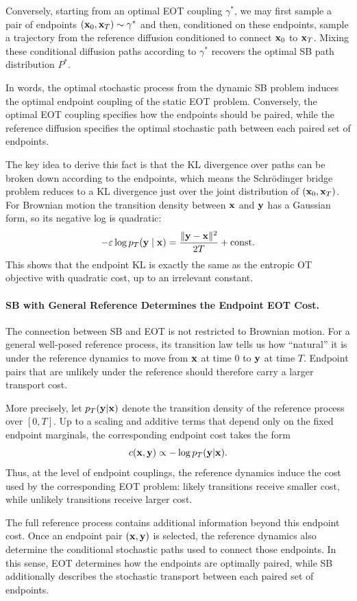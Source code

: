 Conversely, starting from an optimal EOT coupling $\gamma^*$, we may first
sample a pair of endpoints
$({\mathbf{x}}_0,{\mathbf{x}}_T)\sim\gamma^*$ and then, conditioned on these endpoints,
sample a trajectory from the reference diffusion conditioned to connect
${\mathbf{x}}_0$ to ${\mathbf{x}}_T$. Mixing these conditional diffusion paths according
to $\gamma^*$ recovers the optimal SB path distribution $P^*$.

In words, the optimal stochastic process from the dynamic SB problem
induces the optimal endpoint coupling of the static EOT problem. Conversely,
the optimal EOT coupling specifies how the endpoints should be paired,
while the reference diffusion specifies the optimal stochastic path between
each paired set of endpoints.

The key idea to derive this fact is that the KL divergence over paths can be broken down according to the endpoints, which means the Schr\"odinger bridge problem reduces to a KL divergence just over the joint distribution of $({\mathbf{x}}_0,{\mathbf{x}}_T)$. For Brownian motion the transition density between ${\mathbf{x}}$ and ${\mathbf{y}}$ has a Gaussian form, so its negative log is quadratic:
\[
-\varepsilon\log p_T({\mathbf{y}}\mid{\mathbf{x}})=\frac{\|{\mathbf{y}}-{\mathbf{x}}\|^2}{2T}+\text{const}.
\]
This shows that the endpoint KL is exactly the same as the entropic OT objective with quadratic cost, up to an irrelevant constant.


\paragraph{SB with General Reference Determines the Endpoint EOT Cost.}
The connection between SB and EOT is not restricted to Brownian motion.
For a general well-posed reference process, its transition law tells us how
``natural'' it is under the reference dynamics to move from ${\mathbf{x}}$ at time
$0$ to ${\mathbf{y}}$ at time $T$. Endpoint pairs that are unlikely under the
reference should therefore carry a larger transport cost.

More precisely, let $p_T({\mathbf{y}}|{\mathbf{x}})$ denote the transition density of the
reference process over $[0,T]$. Up to a scaling and additive terms that
depend only on the fixed endpoint marginals, the corresponding endpoint
cost takes the form
\[
c({\mathbf{x}},{\mathbf{y}})
\propto
-\log p_T({\mathbf{y}}|{\mathbf{x}}).
\]
Thus, at the level of endpoint couplings, the reference dynamics induce the
cost used by the corresponding EOT problem: likely transitions receive
smaller cost, while unlikely transitions receive larger cost.

The full reference process contains additional information beyond this
endpoint cost. Once an endpoint pair $({\mathbf{x}},{\mathbf{y}})$ is selected, the
reference dynamics also determine the conditional stochastic paths used to
connect those endpoints. In this sense, EOT determines how the endpoints
are optimally paired, while SB additionally describes the stochastic
transport between each paired set of endpoints.





